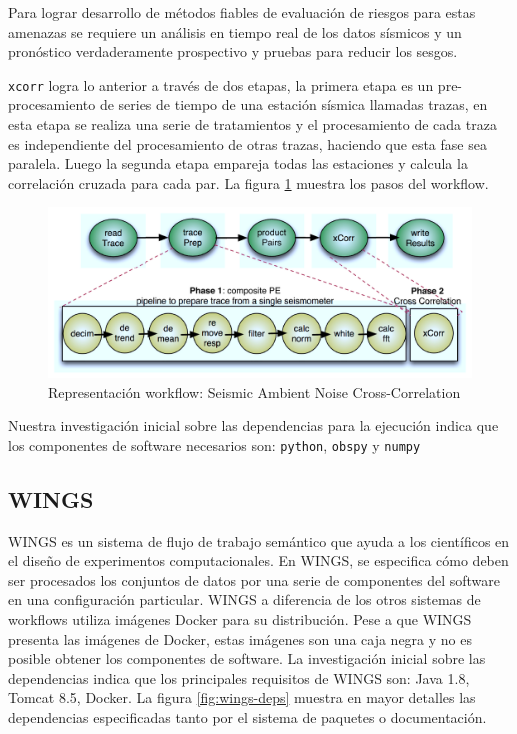 Para lograr desarrollo de métodos fiables de evaluación de riesgos para estas amenazas se requiere un análisis en tiempo real de los datos sísmicos y un pronóstico verdaderamente prospectivo y pruebas para reducir los sesgos.

\texttt{xcorr} logra lo anterior a través de dos etapas, la primera etapa es un pre-procesamiento de series de tiempo de una estación sísmica llamadas trazas, en esta etapa se realiza una serie de tratamientos y el procesamiento de cada traza es independiente del procesamiento de otras trazas, haciendo que esta fase sea paralela. 
Luego la segunda etapa empareja todas las estaciones y calcula la correlación cruzada para cada par. La figura \ref{fig:xcorr} muestra los pasos del workflow.


\begin{figure}[t]
\centering
\includegraphics[width=.8\textwidth]{Figures/xcorr}
\caption[Representación workflow: Seismic Ambient Noise Cross-Correlation]{Representación workflow: Seismic Ambient Noise Cross-Correlation}\label{fig:xcorr}
\end{figure}


Nuestra investigación inicial sobre las dependencias para la ejecución indica que los componentes de software necesarios son: \verb|python|, \verb|obspy| y \verb|numpy|


\subsection{WINGS}

WINGS es un sistema de flujo de trabajo semántico que ayuda a los científicos en el diseño de experimentos computacionales. 
En WINGS, se especifica cómo deben ser procesados los conjuntos de datos por una serie de componentes del software en una configuración particular.
WINGS a diferencia de los otros sistemas de workflows utiliza imágenes Docker para su distribución. Pese a que WINGS presenta las imágenes de Docker, estas imágenes son una caja negra y no es posible obtener los componentes de software.
La investigación inicial sobre las dependencias indica que los principales requisitos de WINGS son: Java 1.8, Tomcat 8.5, Docker. La figura \ref{fig:wings-deps} muestra en mayor detalles las dependencias especificadas tanto por el sistema de paquetes o documentación.

